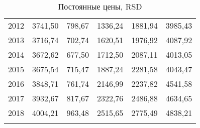 \begin{longtable}{|c|c|c|c|c|c|}
	2012 & 3741,50   & 798,67  & 1336,24  & 1881,94  & 3985,43 \\
	2013 & 3716,74   & 702,74  & 1620,51  & 1976,92  & 4087,92 \\
	2014 & 3672,62   & 677,50  & 1712,50  & 2087,11  & 4013,05 \\
	2015 & 3675,54   & 715,47  & 1887,24  & 2281,58  & 4043,47 \\
	2016 & 3848,71   & 761,74  & 2146,99  & 2237,82  & 4541,58 \\
	2017 & 3932,67   & 817,67  & 2322,76  & 2486,88  & 4634,65 \\
	2018 & 4004,21   & 963,48  & 2515,65  & 2775,49  & 4838,21 \\ \hline
	\caption{\label{tab::gdp_const_rsd} Постоянные цены, RSD}
\end{longtable}
